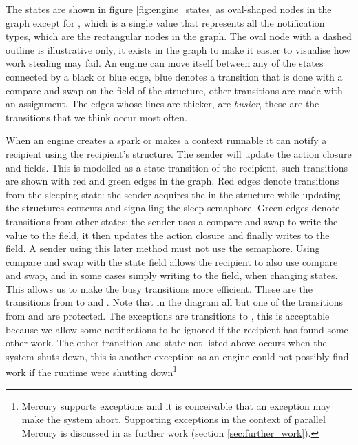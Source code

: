 \noindent
{}
The states are shown in figure \ref{fig:engine_states} as oval-shaped nodes
in the graph except for ,
which is a single value that represents all the notification types,
which are the rectangular nodes in the graph.
The oval node with a dashed outline is illustrative only,
it exists in the graph to make it easier to visualise how work stealing may
fail.
An engine can move itself between any of the states connected by a black or
blue edge,
blue denotes a transition that is done with a compare and swap on the
 field of the \enginesleepsync structure,
other transitions are made with an assignment.
The edges whose lines are thicker, are \emph{busier},
these are the transitions that we think occur most often.

When an engine creates a spark or makes a context runnable
it can notify a recipient using the recipient's
\enginesleepsync structure.
The sender will update the action closure and
 fields.
This is modelled as a state transition of the recipient,
such transitions are shown with red and green edges in the graph.
Red edges denote transitions from the sleeping state:
the sender acquires the  in the
\enginesleepsync structure while updating the structures contents and
signalling the sleep semaphore. 
Green edges denote transitions from other states:
the sender uses a compare and swap to write the  value to the
 field,
it then updates the action closure
and finally writes  to the  field.
A sender using this later method must not use the semaphore.
Using compare and swap with the state field allows the recipient to also
use compare and swap, and in some cases simply writing to the field,
when changing states.
This allows us to make the busy transitions more efficient.
These are the transitions from 
 to
 and 
.
Note that in the diagram all but one of the transitions from
 and 
are protected.
The exceptions are transitions to ,
this is acceptable because we allow some notifications to be ignored if the
recipient has found some other work.
The other transition and state not listed above occurs when the system shuts
down,
this is another exception as an engine could not possibly find work if the
runtime were shutting down\footnote{
    Mercury supports exceptions and it is conceivable that an exception may
    make the system abort.
    Supporting exceptions in the context of parallel Mercury is discussed in
    as further work (section \ref{sec:further_work}).
}

